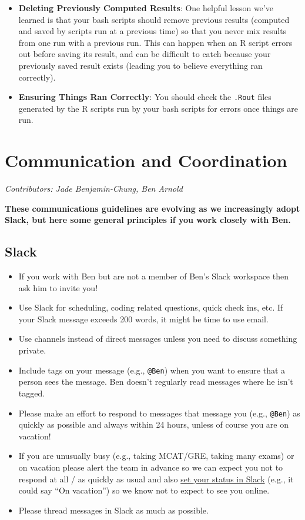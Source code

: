 \documentclass[]{book}
\begin{document}
\begin{itemize}
\item
  \textbf{Deleting Previously Computed Results}: One helpful lesson we've learned is that your bash scripts should remove previous results (computed and saved by scripts run at a previous time) so that you never mix results from one run with a previous run. This can happen when an R script errors out before saving its result, and can be difficult to catch because your previously saved result exists (leading you to believe everything ran correctly).
\item
  \textbf{Ensuring Things Ran Correctly}: You should check the \texttt{.Rout} files generated by the R scripts run by your bash scripts for errors once things are run.
\end{itemize}

\hypertarget{commcoord}{%
\chapter{Communication and Coordination}\label{commcoord}}

\emph{Contributors: Jade Benjamin-Chung, Ben Arnold}

\textbf{These communications guidelines are evolving as we increasingly adopt Slack, but here some general principles if you work closely with Ben.}

\hypertarget{slack}{%
\section{Slack}\label{slack}}

\begin{itemize}
\item
  If you work with Ben but are not a member of Ben's Slack workspace then ask him to invite you!
\item
  Use Slack for scheduling, coding related questions, quick check ins, etc. If your Slack message exceeds 200 words, it might be time to use email.
\item
  Use channels instead of direct messages unless you need to discuss something private.
\item
  Include tags on your message (e.g., \texttt{@Ben}) when you want to ensure that a person sees the message. Ben doesn't regularly read messages where he isn't tagged.
\item
  Please make an effort to respond to messages that message you (e.g., \texttt{@Ben}) as quickly as possible and always within 24 hours, unless of course you are on vacation!
\item
  If you are unusually busy (e.g., taking MCAT/GRE, taking many exams) or on vacation please alert the team in advance so we can expect you not to respond at all / as quickly as usual and also \href{https://get.slack.help/hc/en-us/articles/201864558-Set-your-Slack-status-and-availability}{set your status in Slack} (e.g., it could say ``On vacation'') so we know not to expect to see you online.
\item
  Please thread messages in Slack as much as possible.
\end{itemize}
\end{document}
